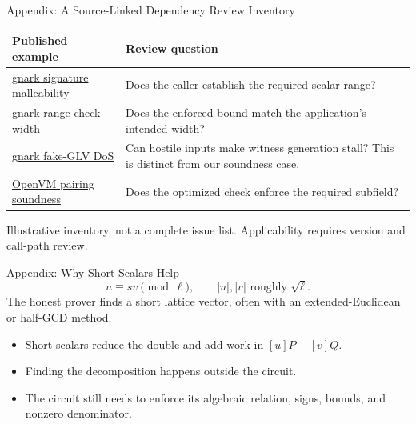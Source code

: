 \documentclass[aspectratio=169,11pt]{beamer}
\begin{document}
\begin{frame}{Appendix: A Source-Linked Dependency Review Inventory}
\small\begin{tabular}{>{\raggedright\arraybackslash}p{}>{\raggedright\arraybackslash}p{}}\toprule
Published example & Review question\\\midrule
\href{https://github.com/Consensys/gnark/security/advisories/GHSA-95v9-hv42-pwrj}{gnark signature malleability} & Does the caller establish the required scalar range?\\[2mm]
\href{https://github.com/Consensys/gnark/security/advisories/GHSA-rjjm-x32p-m3f7}{gnark range-check width} & Does the enforced bound match the application's intended width?\\[2mm]
\href{https://github.com/Consensys/gnark/security/advisories/GHSA-9fvj-xqr2-xwg8}{gnark fake-GLV DoS} & Can hostile inputs make witness generation stall? This is distinct from our soundness case.\\[2mm]
\href{https://github.com/openvm-org/openvm/security/advisories/GHSA-76mq-v757-53gr}{OpenVM pairing soundness} & Does the optimized check enforce the required subfield?\\\bottomrule\end{tabular}\par
\vspace{3mm}Illustrative inventory, not a complete issue list. Applicability requires version and call-path review.
\end{frame}

\begin{frame}{Appendix: Why Short Scalars Help}
\[u\equiv sv\pmod\ell,\qquad |u|,|v|\text{ roughly }\sqrt\ell.\]
The honest prover finds a short lattice vector, often with an extended-Euclidean or half-GCD method.
\begin{itemize}
\item Short scalars reduce the double-and-add work in $[u]P-[v]Q$.
\item Finding the decomposition happens outside the circuit.
\item The circuit still needs to enforce its algebraic relation, signs, bounds, and nonzero denominator.
\end{itemize}
\end{frame}
\end{document}
